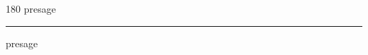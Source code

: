 
\begin{frame}
\begin{center}
\begin{turn}{180}
{\fontsize{2.5cm}{1em}\selectfont presage}
\end{turn}
\vspace{1em}\par  
\hrule
\vspace{1em}\par  
{\fontsize{2.5cm}{1em}\selectfont presage}
\end{center}
\end{frame}
